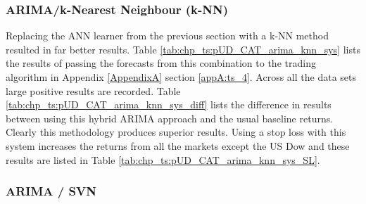 \subsubsection{ARIMA/k-Nearest Neighbour (k-NN)}
Replacing the ANN learner from the previous section with a k-NN method resulted in far better results.  Table \ref{tab:chp_ts:pUD_CAT_arima_knn_sys} lists the results of passing the forecasts from this combination to the trading algorithm in Appendix \ref{AppendixA} section \ref{appA:ts_4}. Across all the data sets large positive results are recorded. Table \ref{tab:chp_ts:pUD_CAT_arima_knn_sys_diff} lists the difference in results between using this hybrid ARIMA approach and the usual baseline returns. Clearly this methodology produces superior results. Using a stop loss with this system increases the returns from all the markets except the US Dow and these results are listed in Table \ref{tab:chp_ts:pUD_CAT_arima_knn_sys_SL}.



\subsubsection{ARIMA / SVN}



